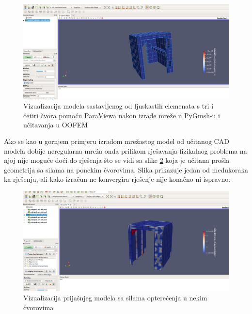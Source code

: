 \documentclass[a4paper,twoside,12pt]{memoir} %
\begin{document}
\begin{figure}[h!t]
\begin{center}
\includegraphics[scale=0.2]{pictures/chapter_zadatak/brodski_element.png}
\caption{Vizualizacija modela sastavljenog od ljuskastih elemenata s tri i četiri čvora pomoću ParaViewa nakon izrade mreže u PyGmsh-u i učitavanja u OOFEM }
\label{fig:brodski_element}
\end{center}
\end{figure}

Ako se kao u gornjem primjeru izradom mrežastog model od učitanog CAD modela dobije neregularna mreža onda prilikom rješavanja fizikalnog problema na njoj nije moguće doći do rješenja što se vidi sa slike \ref{fig:brodski_element_pomaci} koja je učitana prošla geometrija sa silama na ponekim čvorovima. Slika prikazuje jedan od međukoraka ka rješenju, ali kako izračun ne konvergira rješenje nije konačno ni ispravno.

\begin{figure}[h!t]
\begin{center}
\includegraphics[scale=0.2]{pictures/chapter_zadatak/brodski_element_pomaci.png}
\caption{Vizualizacija prijašnjeg modela sa silama opterećenja u nekim čvorovima }
\label{fig:brodski_element_pomaci}
\end{center}
\end{figure}
\end{document}
